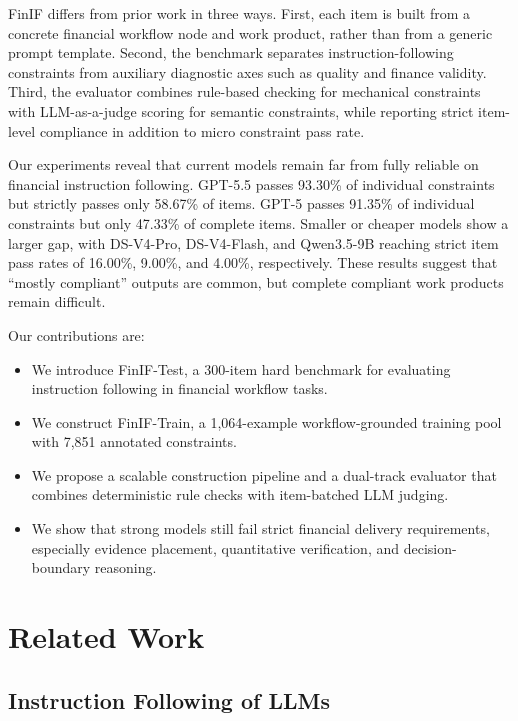\documentclass[11pt]{article}
\begin{document}
FinIF differs from prior work in three ways. First, each item is built from a concrete financial workflow node and work product, rather than from a generic prompt template. Second, the benchmark separates instruction-following constraints from auxiliary diagnostic axes such as quality and finance validity. Third, the evaluator combines rule-based checking for mechanical constraints with LLM-as-a-judge scoring for semantic constraints, while reporting strict item-level compliance in addition to micro constraint pass rate.

Our experiments reveal that current models remain far from fully reliable on financial instruction following. GPT-5.5 passes 93.30\% of individual constraints but strictly passes only 58.67\% of items. GPT-5 passes 91.35\% of individual constraints but only 47.33\% of complete items. Smaller or cheaper models show a larger gap, with DS-V4-Pro, DS-V4-Flash, and Qwen3.5-9B reaching strict item pass rates of 16.00\%, 9.00\%, and 4.00\%, respectively. These results suggest that ``mostly compliant'' outputs are common, but complete compliant work products remain difficult.

Our contributions are:
\begin{itemize}
    \item We introduce FinIF-Test, a 300-item hard benchmark for evaluating instruction following in financial workflow tasks.
    \item We construct FinIF-Train, a 1,064-example workflow-grounded training pool with 7,851 annotated constraints.
    \item We propose a scalable construction pipeline and a dual-track evaluator that combines deterministic rule checks with item-batched LLM judging.
    \item We show that strong models still fail strict financial delivery requirements, especially evidence placement, quantitative verification, and decision-boundary reasoning.
\end{itemize}

\section{Related Work}

\subsection{Instruction Following of LLMs}
\end{document}
